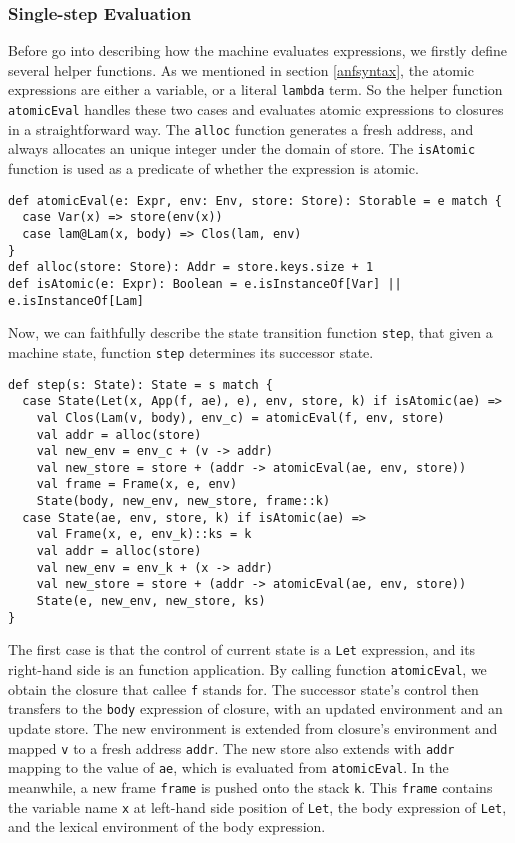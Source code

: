 \documentclass[acmsmall,review,anonymous]{acmart}\settopmatter{printfolios=true,printccs=false,printacmref=false}
\begin{document}
\subsubsection{Single-step Evaluation}
Before go into describing how the machine evaluates expressions, we firstly define several helper functions.
As we mentioned in section \ref{anfsyntax}, the atomic expressions are either a variable, or
a literal \texttt{lambda} term. So the helper function \texttt{atomicEval} handles these two
cases and evaluates atomic expressions to closures in a straightforward way.
The \texttt{alloc} function generates a fresh address, and always allocates an unique integer under the domain
of store.
The \texttt{isAtomic} function is used as a predicate of whether the expression is atomic.

\begin{verbatim}
def atomicEval(e: Expr, env: Env, store: Store): Storable = e match {
  case Var(x) => store(env(x))
  case lam@Lam(x, body) => Clos(lam, env)
}
def alloc(store: Store): Addr = store.keys.size + 1
def isAtomic(e: Expr): Boolean = e.isInstanceOf[Var] || e.isInstanceOf[Lam]
\end{verbatim}

Now, we can faithfully describe the state transition function \texttt{step},
that given a machine state, function \texttt{step} determines its successor state.

\begin{verbatim}
def step(s: State): State = s match {
  case State(Let(x, App(f, ae), e), env, store, k) if isAtomic(ae) =>
    val Clos(Lam(v, body), env_c) = atomicEval(f, env, store)
    val addr = alloc(store)
    val new_env = env_c + (v -> addr)
    val new_store = store + (addr -> atomicEval(ae, env, store))
    val frame = Frame(x, e, env)
    State(body, new_env, new_store, frame::k)
  case State(ae, env, store, k) if isAtomic(ae) =>
    val Frame(x, e, env_k)::ks = k
    val addr = alloc(store)
    val new_env = env_k + (x -> addr)
    val new_store = store + (addr -> atomicEval(ae, env, store))
    State(e, new_env, new_store, ks)
}
\end{verbatim}

The first case is that the control of current state is a \texttt{Let} expression,
and its right-hand side is an function application.
By calling function \texttt{atomicEval}, we obtain the closure that callee \texttt{f} stands for.
The successor state's control then transfers to the \texttt{body} expression of closure,
with an updated environment and an update store. The new environment is extended
from closure's environment and mapped \texttt{v} to a fresh address \texttt{addr}.
The new store also extends with \texttt{addr} mapping to the value of \texttt{ae},
which is evaluated from \texttt{atomicEval}.
In the meanwhile, a new frame \texttt{frame} is pushed onto the stack \texttt{k}.
This \texttt{frame} contains the variable name \texttt{x} at left-hand side position of \texttt{Let},
the body expression of \texttt{Let}, and the lexical environment of the body expression.
\end{document}
